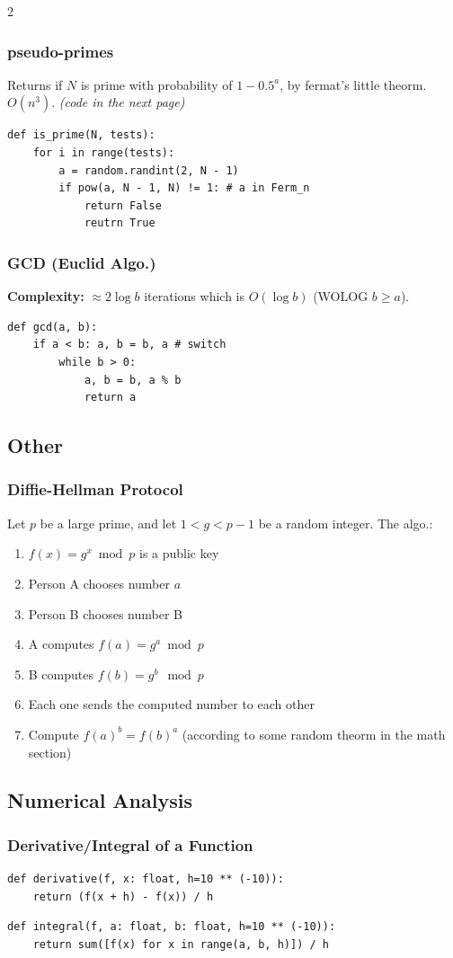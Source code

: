 \documentclass[]{article}
\begin{document}
\begin{multicols}{2}
		\subsubsection{pseudo-primes}
		Returns if $ N $ is prime with probability of $ 1 - 0.5^{a} $, by fermat's little theorm. $O(n^3)$. \textit{(code in the next page)}
		\pagebreak
		\begin{lstlisting}
def is_prime(N, tests): 
	for i in range(tests): 
		a = random.randint(2, N - 1)
		if pow(a, N - 1, N) != 1: # a in Ferm_n
			return False
			reutrn True\end{lstlisting}
		\subsubsection{GCD (Euclid Algo.)}
		\textbf{Complexity: }$ \approx 2 \log b $ iterations which is $ O(\log b) $ (WOLOG $ b \ge a $). 
		\begin{lstlisting}
def gcd(a, b): 
	if a < b: a, b = b, a # switch
		while b > 0: 
			a, b = b, a % b
			return a\end{lstlisting}
		
		\subsection{Other}
		\subsubsection{Diffie-Hellman Protocol}
		Let $ p $ be a large prime, and let $ 1 < g < p - 1 $ be a random integer. The algo.: 
		\begin{enumerate}
			\item $ f(x) = g^x \bmod p $ is a public key
			\item Person A chooses number $ a $
			\item Person B chooses number B
			\item A computes $ f(a) = g^a \bmod p $
			\item B computes $ f(b) = g^b \mod p $
			\item Each one sends the computed number to each other
			\item Compute $ f(a)^b = f(b)^a $ (according to some random theorm in the math section) 
		\end{enumerate}
		\subsection{Numerical Analysis}
		\subsubsection*{Derivative/Integral of a Function}
		\begin{lstlisting}
def derivative(f, x: float, h=10 ** (-10)):
    return (f(x + h) - f(x)) / h
        \end{lstlisting}
		\begin{lstlisting}
def integral(f, a: float, b: float, h=10 ** (-10)):
    return sum([f(x) for x in range(a, b, h)]) / h
        \end{lstlisting}

\end{multicols}
\end{document}
